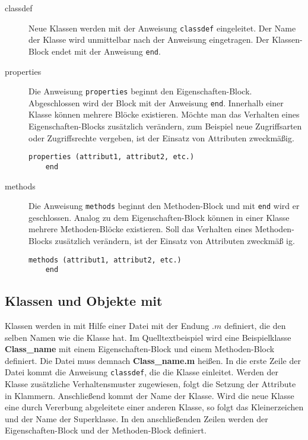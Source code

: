 \begin{description}

	\item[classdef] Neue Klassen werden mit der Anweisung
	\lstinline$classdef$ eingeleitet. Der Name der Klasse wird unmittelbar
	nach der Anweisung eingetragen. Der Klassen-Block endet mit der
	Anweisung \lstinline$end$.
	\item[properties] Die Anweisung \lstinline$properties$ beginnt den
	Eigenschaften-Block. Abgeschlossen wird der Block mit der Anweisung
	\lstinline$end$.  Innerhalb einer Klasse k\"onnen mehrere Bl\"ocke
	existieren. M\"ochte man das Verhalten eines Eigenschaften-Blocks
	zus\"atzlich ver\"andern, zum Beispiel neue Zugriffsarten oder
	Zugriffsrechte vergeben, ist der Einsatz von Attributen zweckm\"a\ss ig.
	\begin{lstlisting}[frame=none]
	properties (attribut1, attribut2, etc.)
	end
	\end{lstlisting}
	\item[methods] Die Anweisung \lstinline$methods$ beginnt den
	Methoden-Block und mit \lstinline$end$ wird er geschlossen. Analog zu
	dem Eigenschaften-Block k\"onnen in einer Klasse mehrere
	Methoden-Bl\"ocke existieren. Soll das Verhalten eines Methoden-Blocks
	zus\"atzlich ver\"andern, ist der Einsatz von Attributen zweckm\"a\ss
	ig.
	\begin{lstlisting}[frame=none]
	methods (attribut1, attribut2, etc.)
	end
	\end{lstlisting}


\end{description}


\subsection*{Klassen und Objekte mit \matlab}

Klassen werden in \matlab mit Hilfe einer Datei mit der Endung $.m$ definiert,
die den selben Namen wie die Klasse hat. Im Quelltextbeispiel
 wird eine Beispielklasse \textbf{Class\_name} mit
einem Eigenschaften-Block und einem Methoden-Block definiert. Die Datei muss
demnach \textbf{Class\_name.m} hei\ss en. In die erste Zeile der Datei kommt die
Anweisung \lstinline$classdef$, die die Klasse einleitet. Werden der Klasse
zus\"atzliche Verhaltensmuster zugewiesen, folgt die Setzung der Attribute in
Klammern. Anschlie\ss end kommt der Name der Klasse. Wird die neue Klasse eine
durch Vererbung abgeleitete einer anderen Klasse, so folgt das Kleinerzeichen
und der Name der Superklasse. In den anschlie\ss enden Zeilen werden der
Eigenschaften-Block und der Methoden-Block definiert.

